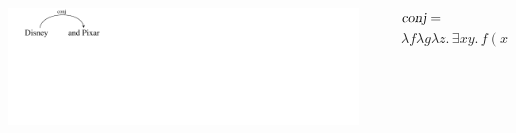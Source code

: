 \documentclass[mathserif,12pt]{beamer}
\renewcommand{\land}{\wedge}
\newcommand{\lspace}{.\,}
\begin{document}
\begin{frame}
\begin{columns}
 \end{columns}
 
 \pause
  \vspace{0.6cm}
 \begin{columns}
  \begin{column}{0.39\textwidth}
   \centering
\includegraphics[trim=1em 9em 28em 0em,clip=true,scale=1.3]{figures/conj}
  \end{column}
  \begin{column}{0.1\textwidth}
  \end{column}
  \begin{column}{0.61\textwidth}
\large    $\textsl{conj} =$ \\ $ \lambda f \lambda g \lambda z \lspace \exists x y \lspace f(x) \land g(y) \land \mathrm{coord}(z,x,y)$ 
  \end{column}
 \end{columns}
\end{frame}
\end{document}
